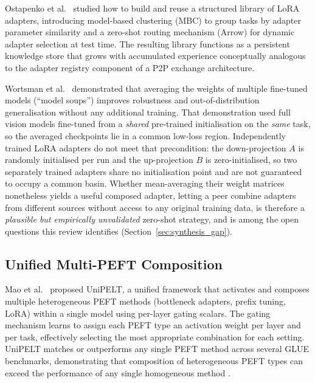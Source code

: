 Ostapenko et al.~\cite{Ostapenko2024} studied how to build and reuse a structured library of LoRA
adapters, introducing model-based clustering (MBC) to group tasks by adapter parameter
similarity and a zero-shot routing mechanism (Arrow) for dynamic adapter selection at
test time. The resulting library functions as a persistent knowledge store that
grows with accumulated experience conceptually analogous to the adapter registry
component of a P2P exchange architecture.

Wortsman et al.~\cite{Wortsman2022} demonstrated that averaging the weights of multiple fine-tuned
models (``model soups'') improves robustness and out-of-distribution generalisation
without any additional training. That demonstration used full vision models
fine-tuned from a \emph{shared} pre-trained initialisation on the \emph{same}
task, so the averaged checkpoints lie in a common low-loss region. Independently
trained LoRA adapters do not meet that precondition: the down-projection $A$ is
randomly initialised per run and the up-projection $B$ is zero-initialised, so
two separately trained adapters share no initialisation point and are not
guaranteed to occupy a common basin. Whether mean-averaging their weight
matrices nonetheless yields a useful composed adapter, letting a peer combine
adapters from different sources without access to any original training data,
is therefore a \emph{plausible but empirically unvalidated} zero-shot strategy,
and is among the open questions this review identifies
(Section~\ref{sec:synthesis_gap}).

\subsection{Unified Multi-PEFT Composition}
\label{sec:adapter_composition:unified}

Mao et al.~\cite{MaoUniPELT2022} proposed UniPELT, a unified framework that activates and
composes multiple heterogeneous PEFT methods (bottleneck adapters, prefix tuning, LoRA)
within a single model using per-layer gating scalars. The gating mechanism learns to
assign each PEFT type an activation weight per layer and per task, effectively selecting
the most appropriate combination for each setting. UniPELT matches or outperforms any
single PEFT method across several GLUE benchmarks\footnotemark, demonstrating that composition of
heterogeneous PEFT types can exceed the performance of any single homogeneous method
\cite{MaoUniPELT2022}.

